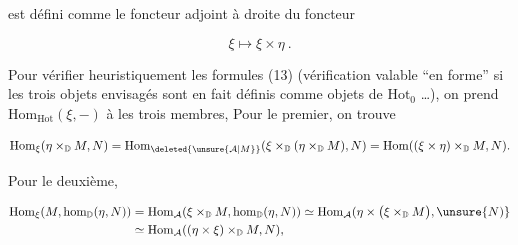 est défini comme le foncteur adjoint à droite du foncteur

\[\xi\longmapsto\xi\times\eta\ .\]

Pour vérifier heuristiquement les formules (13) (vérification valable ``en forme'' si les trois objets envisagés sont en fait définis comme objets de $\mathrm{Hot}_0$ \dots), on prend $\mathrm{Hom}_{\mathrm{Hot}}(\xi,-)$ à   les trois membres,  Pour le premier, on trouve

\[\mathrm{Hom}_{\xi}(\eta\times_{\mathbb D}M,N)=\mathrm{Hom}_{\deleted{\unsure{\mathcal A|M}}}(\xi\times_{\mathbb D}(\eta\times_{\mathbb D}M),N)=\mathrm{Hom}((\xi\times\eta)\times_{\mathbb D}M,N).\]

Pour le deuxième,

\[
\begin{aligned}
\mathrm{Hom}_{\xi}(M,\mathrm{hom}_{\mathbb D}(\eta,N))&=\mathrm{Hom}_{\mathcal A}(\xi\times_{\mathbb D}M,\mathrm{hom}_{\mathbb D}(\eta,N))\simeq\mathrm{Hom}_{\mathcal A}(\eta\times\bigl(\xi\times_{\mathbb D}M\bigr),\unsure{N)}\\
&\simeq\mathrm{Hom}_{\mathcal A}((\eta\times\xi)\times_{\mathbb D}M,N),
\end{aligned}
\]

